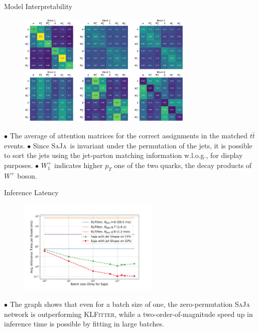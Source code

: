 \documentclass[10pt]{beamer}
\newcommand{\saja}[0]{\textsc{SaJa}}
\begin{document}



\begin{frame}[fragile]{Model Interpretability}
    \begin{figure}
        \centering
        \includegraphics[width=0.75\textwidth]{figures/attention/attention_tt_mg5_pythia8_alljets_dR-0.30_test_delphys_minmax_jet-shape_correct.pdf}
    \end{figure}
    
    {\scriptsize $\bullet$ The average of attention matrices for the correct assignments in the matched $t\bar{t}$ events.}
    \break
    {\scriptsize $\bullet$ Since \saja\, is invariant under the permutation of the jets, it is possible to sort the jets using the jet-parton matching information w.l.o.g., for display purposes.}
    \break
    {\scriptsize $\bullet$ $W_{1}^{+}$ indicates higher $p_{T}$ one of the two quarks, the decay products of $W^{+}$ boson.}
\end{frame}

\begin{frame}[fragile]{Inference Latency}
    \begin{figure}
        \centering
        \includegraphics[width=0.6\textwidth]{figures/misc/latency.pdf}
    \end{figure}
    \medskip
    $\bullet$ The graph shows that even for a batch size of one, the zero-permutation \saja\, network is outperforming \textsc{KLFitter}, while a two-order-of-magnitude speed up in inference time is possible by fitting in large batches.
\end{frame}
\end{document}
